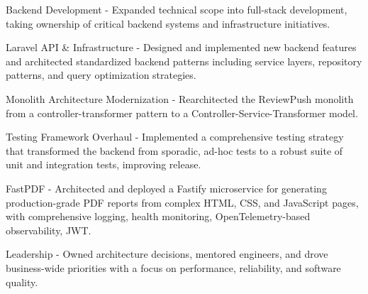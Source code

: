 \begin{cventries}
{\begin{cvsubitems}
        \end{cvsubitems}
        \begin{cvitems} %
            \item {Backend Development - Expanded technical scope into full-stack development, taking ownership of critical backend systems and infrastructure initiatives.}
        \end{cvitems}
        \begin{cvsubitems}
            \item {Laravel API \& Infrastructure - Designed and implemented new backend features and architected standardized backend patterns including service layers, repository patterns, and query optimization strategies.}
            \item {Monolith Architecture Modernization - Rearchitected the ReviewPush monolith from a controller-transformer pattern to a Controller-Service-Transformer model.}
            \item {Testing Framework Overhaul - Implemented a comprehensive testing strategy that transformed the backend from sporadic, ad-hoc tests to a robust suite of unit and integration tests, improving release.}
            \item {FastPDF - Architected and deployed a Fastify microservice for generating production-grade PDF reports from complex HTML, CSS, and JavaScript pages, with comprehensive logging, health monitoring, OpenTelemetry-based observability, JWT.}
        \end{cvsubitems}
        \begin{cvitems}
            \item {Leadership - Owned architecture decisions, mentored engineers, and drove business-wide priorities with a focus on performance, reliability, and software quality.}
        \end{cvitems}
    }
\end{cventries}
